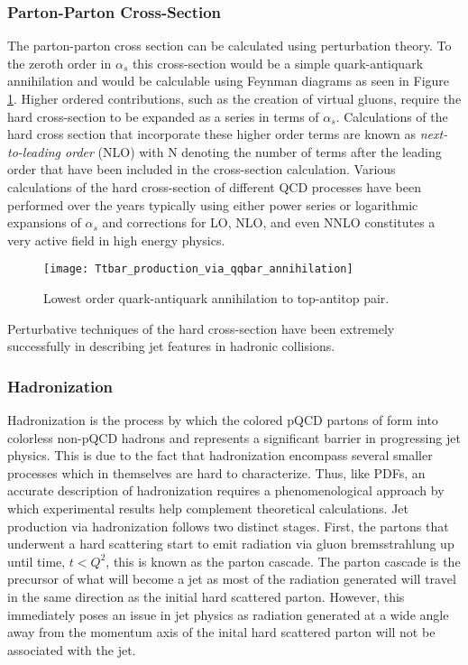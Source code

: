 \subsubsection{Parton-Parton Cross-Section}
The parton-parton cross section can be calculated using perturbation theory.  To the zeroth order in $\alpha_{s}$ this cross-section would be a simple quark-antiquark annihilation and would be calculable using Feynman diagrams as seen in Figure \ref{fig:qqbar}\cite{Collins:1989gx}.  Higher ordered contributions, such as the creation of virtual gluons, require the hard cross-section to be expanded as a series in terms of $\alpha_{s}$.  Calculations of the hard cross section that incorporate these higher order terms are known as \textit{next-to-leading order} (NLO) with N denoting the number of terms after the leading order that have been included in the cross-section calculation.  Various calculations of the hard cross-section of different QCD processes have been performed over the years typically using either power series or logarithmic expansions of $\alpha_{s}$\cite{Brambilla:2006wp} and corrections for LO, NLO, and even NNLO constitutes a very active field in high energy physics.

\begin{figure}[h]
\texttt{[image: Ttbar\_production\_via\_qqbar\_annihilation]}
\centering
\caption{Lowest order quark-antiquark annihilation to top-antitop pair\cite{Erdmann:2001ne}.}
\label{fig:qqbar}
\end{figure}

Perturbative techniques of the hard cross-section have been extremely successfully in describing jet features in hadronic collisions\cite{Fritzsch:1992mu}.
\subsubsection{Hadronization}

Hadronization is the process by which the colored pQCD partons of form into colorless non-pQCD hadrons and represents a significant barrier in progressing jet physics.  This is due to the fact that hadronization encompass several smaller processes which in themselves are hard to characterize. Thus, like PDFs, an accurate description of hadronization requires a phenomenological approach by which experimental results help complement theoretical calculations.  Jet production via hadronization\cite{Webber:1994zd} follows two distinct stages.  First, the partons that underwent a hard scattering start to emit radiation via gluon bremsstrahlung up until time, $t < Q^{2}$, this is known as the parton cascade.  The parton cascade is the precursor of what will become a jet as most of the radiation generated will travel in the same direction as the initial hard scattered parton.  However, this immediately poses an issue in jet physics as radiation generated at a wide angle away from the momentum axis of the inital hard scattered parton will not be associated with the jet.


